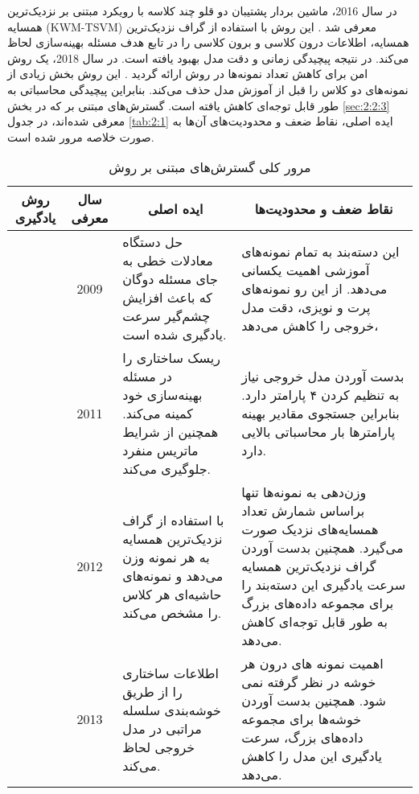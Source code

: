 در سال 2016، ماشین بردار پشتیبان دو قلو چند کلاسه با رویکرد مبتنی بر نزدیک‌ترین همسایه (\gls{KWM-TSVM}) معرفی شد \cite{xu2016}. این روش با استفاده از گراف نزدیک‌ترین همسایه، اطلاعات درون کلاسی و برون کلاسی را در تابع هدف مسئله بهینه‌سازی لحاظ می‌کند. در نتیجه پیچیدگی زمانی و دقت مدل بهبود یافته است. در سال 2018، یک روش امن برای کاهش تعداد نمونه‌ها  در روش  ارائه گردید \cite{pang2018}. این روش بخش زیادی از نمونه‌های دو کلاس را قبل از آموزش مدل حذف می‌کند. بنابراین پیچیدگی محاسباتی به طور قابل توجه‌ای کاهش یافته است. گسترش‌های مبتنی بر  که در بخش \ref{sec:2:2:3} معرفی شده‌اند، در جدول \ref{tab:2:1} ایده اصلی، نقاط ضعف و محدودیت‌های آن‌ها به صورت خلاصه مرور شده است.
\begin{sidewaystable*}
	\small
	\centering
	\caption{مرور کلی گسترش‌های مبتنی بر روش  }
	
	\begin{tabular}{c c p{8cm} p{8cm}}
		\hline
		روش یادگیری & سال معرفی & \multicolumn{1}{c}{ایده اصلی} &  \multicolumn{1}{c}{نقاط ضعف و محدودیت‌ها} \\
		\hline
		\lr{LS-TSVM} \cite{kumar2009} & 2009 & حل دستگاه معادلات خطی به جای مسئله دوگان که باعث افزایش چشم‌گیر سرعت یادگیری شده است. & این دسته‌بند به تمام نمونه‌های آموزشی اهمیت یکسانی می‌دهد. از این رو نمونه‌های پرت و نویزی، دقت مدل خروجی را کاهش می‌دهد،\\
		
		\lr{TBSVM} \cite{shao2011} & 2011 & ریسک ساختاری را در مسئله بهینه‌سازی خود کمینه می‌کند. همچنین از شرایط ماتریس منفرد جلوگیری می‌کند. & بدست آوردن مدل خروجی نیاز به تنظیم کردن ۴ پارامتر دارد. بنابراین جستجوی مقادیر بهینه پارامترها بار محاسباتی بالایی دارد.\\
		
		\lr{WLTSVM} \cite{ye2012} & 2012 & با استفاده از گراف نزدیک‌ترین همسایه به هر نمونه وزن می‌دهد و نمونه‌های حاشیه‌ای هر کلاس را مشخص می‌کند. & وزن‌دهی به نمونه‌ها تنها براساس شمارش تعداد همسایه‌های نزدیک صورت می‌گیرد. همچنین بدست آوردن گراف نزدیک‌ترین همسایه سرعت یادگیری این دسته‌بند را برای مجموعه داده‌های بزرگ به طور قابل توجه‌ای کاهش می‌دهد.\\
		
		\lr{STSVM} \cite{qi2013} & 2013 & اطلاعات ساختاری را از طریق خوشه‌بندی سلسله مراتبی در مدل خروجی لحاظ می‌کند. & اهمیت نمونه های درون هر خوشه در نظر گرفته نمی شود. همچنین بدست آوردن خوشه‌ها برای مجموعه داده‌های بزرگ، سرعت یادگیری این مدل را کاهش می‌دهد.\\
		

\end{tabular}
\end{sidewaystable*}
